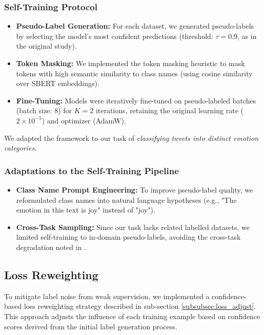 \subsubsection*{Self-Training Protocol}
\begin{itemize}
    \item \textbf{Pseudo-Label Generation:} For each dataset, we generated pseudo-labels by selecting the model’s most confident predictions (threshold: $\tau = 0.9$, as in the original study).
    \item \textbf{Token Masking:} We implemented the token masking heuristic to mask tokens with high semantic similarity to class names (using cosine similarity over SBERT embeddings).
    \item \textbf{Fine-Tuning:} Models were iteratively fine-tuned on pseudo-labeled batches (batch size: 8) for $K = 2$ iterations, retaining the original learning rate ($2 \times 10^{-5}$) and optimizer (AdamW).
\end{itemize}

\noindent
We adapted the framework to our task of \textit{classifying tweets into distinct emotion categories}.

\subsubsection*{Adaptations to the Self-Training Pipeline}
\begin{itemize}
    \item \textbf{Class Name Prompt Engineering:} To improve pseudo-label quality, we reformulated class names into natural language hypotheses (e.g., "The emotion in this text is joy" instead of "joy").
    \item \textbf{Cross-Task Sampling:} Since our task lacks related labelled datasets, we limited self-training to in-domain pseudo-labels, avoiding the cross-task degradation noted in \cite{gera_zero-shot_2022}.
\end{itemize}


\subsection{Loss Reweighting}  
\label{sec:loss_reweighting}  

To mitigate label noise from weak supervision, we implemented a confidence-based loss reweighting strategy described in sub-section \ref{subsubsec:loss_adjust}. This approach adjusts the influence of each training example based on confidence scores derived from the initial label generation process.  

